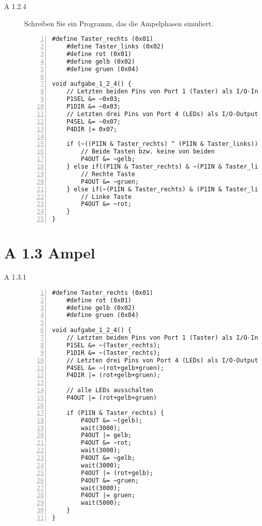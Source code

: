 \documentclass[11pt,a4paper,ngerman]{article}
\begin{document}
\begin{description}
	\item[A 1.2.4] Schreiben Sie ein Programm, das die Ampelphasen simuliert. \\
	
	\begin{lstlisting}[numbers=left]
	#define Taster_rechts (0x01)
	#define Taster_links (0x02)
	#define rot (0x01)
	#define gelb (0x02)
	#define gruen (0x04)
	
void aufgabe_1_2_4() {
	// Letzten beiden Pins von Port 1 (Taster) als I/O-Input verwenden
	P1SEL &= ~0x03;
	P1DIR &= ~0x03;
	// Letzten drei Pins von Port 4 (LEDs) als I/O-Output verwenden
	P4SEL &= ~0x07;
	P4DIR |= 0x07;
	
	if (~((P1IN & Taster_rechts) ^ (P1IN & Taster_links))) {
		// Beide Tasten bzw. keine von beiden
		P4OUT &= ~gelb;
	} else if((P1IN & Taster_rechts) & ~(P1IN & Taster_lins)) {
		// Rechte Taste
		P4OUT &= ~gruen;
	} else if(~(P1IN & Taster_rechts) & (P1IN & Taster_lins)) {
		// Linke Taste
		P4OUT &= ~rot;
	}
}
\end{lstlisting}

\end{description}

\section*{A 1.3 Ampel}
\begin{description}
\item[A 1.3.1]

\begin{lstlisting}[numbers=left]
	#define Taster_rechts (0x01)
	#define rot (0x01)
	#define gelb (0x02)
	#define gruen (0x04)
	
void aufgabe_1_2_4() {
	// Letzten beiden Pins von Port 1 (Taster) als I/O-Input verwenden
	P1SEL &= ~(Taster_rechts);
	P1DIR &= ~(Taster_rechts);
	// Letzten drei Pins von Port 4 (LEDs) als I/O-Output verwenden
	P4SEL &= ~(rot+gelb+gruen);
	P4DIR |= (rot+gelb+gruen);
	
	// alle LEDs ausschalten
	P4OUT |= (rot+gelb+gruen)
	
	if (P1IN & Taster_rechts) {
		P4OUT &= ~(gelb);
		wait(3000);
		P4OUT |= gelb;
		P4OUT &= ~rot;
		wait(3000);
		P4OUT &= ~gelb;
		wait(3000);
		P4OUT |= (rot+gelb);
		P4OUT &= ~gruen;
		wait(3000);
		P4OUT |= gruen;
		wait(5000);
	}
}
\end{lstlisting}
\end{description}
\end{document}
